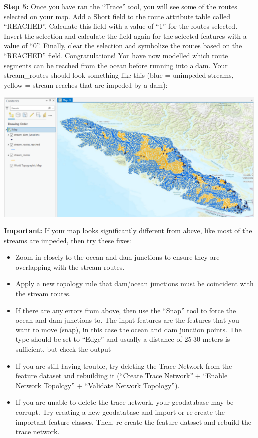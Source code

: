 \documentclass[
]{book}
\begin{document}
\textbf{Step 5:} Once you have ran the ``Trace'' tool, you will see some of the routes selected on your map. Add a Short field to the route attribute table called ``REACHED''. Calculate this field with a value of ``1'' for the routes selected. Invert the selection and calculate the field again for the selected features with a value of ``0''. Finally, clear the selection and symbolize the routes based on the ``REACHED'' field. Congratulations! You have now modelled which route segments can be reached from the ocean before running into a dam. Your stream\_routes should look something like this (blue = unimpeded streams, yellow = stream reaches that are impeded by a dam):

\includegraphics[width=0.75\linewidth]{images/02-traced-network}

\textbf{Important:} If your map looks significantly different from above, like most of the streams are impeded, then try these fixes:

\begin{itemize}
\item
  Zoom in closely to the ocean and dam junctions to ensure they are overlapping with the stream routes.
\item
  Apply a new topology rule that dam/ocean junctions must be coincident with the stream routes.
\item
  If there are any errors from above, then use the ``Snap'' tool to force the ocean and dam junctions to. The input features are the features that you want to move (snap), in this case the ocean and dam junction points. The type should be set to ``Edge'' and usually a distance of 25-30 meters is sufficient, but check the output
\item
  If you are still having trouble, try deleting the Trace Network from the feature dataset and rebuilding it (``Create Trace Network'' + ``Enable Network Topology'' + ``Validate Network Topology'').
\item
  If you are unable to delete the trace network, your geodatabase may be corrupt. Try creating a new geodatabase and import or re-create the important feature classes. Then, re-create the feature dataset and rebuild the trace network.
\end{itemize}
\end{document}
